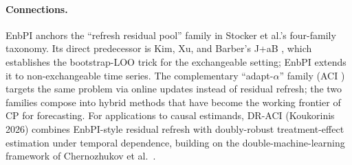 \documentclass[letterpaper,11pt,leqno]{article}
\newcommand{\bib}{paper.bib}
\begin{document}
\paragraph{Connections.} EnbPI anchors the ``refresh residual pool'' family in Stocker et al.'s \cite{stocker2025gentle} four-family taxonomy. Its direct predecessor is Kim, Xu, and Barber's J+aB \cite{kim2020jpb}, which establishes the bootstrap-LOO trick for the exchangeable setting; EnbPI extends it to non-exchangeable time series. The complementary ``adapt-$\alpha$'' family (ACI \cite{gibbs2021aci, zaffran2022aci}) targets the same problem via online updates instead of residual refresh; the two families compose into hybrid methods that have become the working frontier of CP for forecasting. For applications to causal estimands, DR-ACI (Koukorinis 2026) combines EnbPI-style residual refresh with doubly-robust treatment-effect estimation under temporal dependence, building on the double-machine-learning framework of Chernozhukov et al.~\cite{chernozhukov2018double}.


\end{document}
